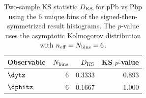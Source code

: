 \begin{table}[hbtp]
\centering
\begin{tabular}{|l|r|r|r|}
\hline
Observable & $N_{\rm bins}$ & $D_{\rm KS}$ & KS $p$-value \\
\hline
$\dytz$ & 6 & 0.3333 & 0.893 \\
$\dphitz$ & 6 & 0.1667 & 1.000 \\
\hline
\end{tabular}
\caption{Two-sample KS statistic $D_{\rm KS}$ for pPb vs Pbp using the 6 unique bins of the signed-then-symmetrized result histograms. The $p$-value uses the asymptotic Kolmogorov distribution with $n_{\rm eff} = N_{\rm bins} = 6$.}
\label{table:combining_ks}
\end{table}
